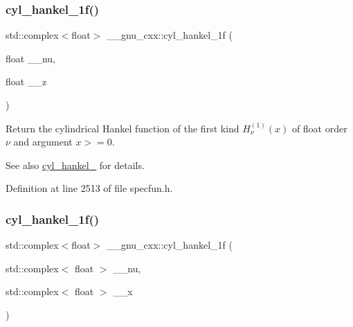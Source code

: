 \subsubsection{\texorpdfstring{cyl\+\_\+hankel\+\_\+1f()}{cyl\_hankel\_1f()}\hspace{0.1cm}{\footnotesize\ttfamily [1/2]}}
{\footnotesize\ttfamily std\+::complex$<$float$>$ \+\_\+\+\_\+gnu\+\_\+cxx\+::cyl\+\_\+hankel\+\_\+1f (\begin{DoxyParamCaption}\item[{float}]{\+\_\+\+\_\+nu,  }\item[{float}]{\+\_\+\+\_\+z }\end{DoxyParamCaption})\hspace{0.3cm}{\ttfamily [inline]}}

Return the cylindrical Hankel function of the first kind $ H^{(1)}_\nu(x) $ of {\ttfamily float} order $ \nu $ and argument $ x >= 0 $.

\begin{DoxySeeAlso}{See also}
\hyperlink{group__gnu__math__spec__func_ga5329bba77d10a9d2f15d9bbe43a70db3}{cyl\+\_\+hankel\+\_} for details. 
\end{DoxySeeAlso}


Definition at line 2513 of file specfun.\+h.

\mbox{\label{group__gnu__math__spec__func_ga810e021a3f11c1b2253c15c6f4d41143}} 
\subsubsection{\texorpdfstring{cyl\+\_\+hankel\+\_\+1f()}{cyl\_hankel\_1f()}\hspace{0.1cm}{\footnotesize\ttfamily [2/2]}}
{\footnotesize\ttfamily std\+::complex$<$float$>$ \+\_\+\+\_\+gnu\+\_\+cxx\+::cyl\+\_\+hankel\+\_\+1f (\begin{DoxyParamCaption}\item[{std\+::complex$<$ float $>$}]{\+\_\+\+\_\+nu,  }\item[{std\+::complex$<$ float $>$}]{\+\_\+\+\_\+x }\end{DoxyParamCaption})\hspace{0.3cm}{\ttfamily [inline]}}

